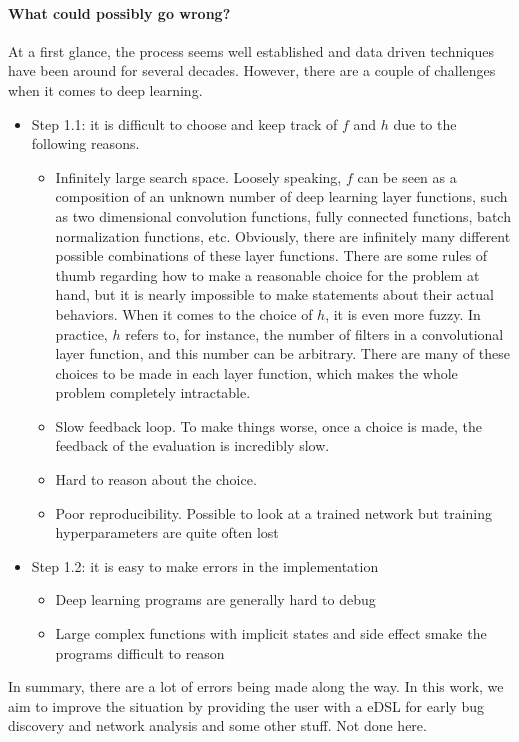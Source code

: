 \paragraph{What could possibly go wrong?}
At a first glance, the process seems well established and data driven techniques have been around for several decades. However, there are a couple of challenges when it comes to deep learning.
\begin{itemize}
\item Step 1.1: it is difficult to choose and keep track of $f$ and $h$ due to the following reasons.
\begin{itemize}
\item Infinitely large search space. Loosely speaking, $f$ can be seen as a composition of an unknown number of deep learning layer functions, such as two dimensional convolution functions, fully connected functions, batch normalization functions, etc. Obviously, there are infinitely many different possible combinations of these layer functions. There are some rules of thumb regarding how to make a reasonable choice for the problem at hand, but it is nearly impossible to make statements about their actual behaviors. When it comes to the choice of $h$, it is even more fuzzy. In practice, $h$ refers to, for instance, the number of filters in a convolutional layer function, and this number can be arbitrary. There are many of these choices to be made in each layer function, which makes the whole problem completely intractable.
\item Slow feedback loop. To make things worse, once a choice is made, the feedback of the evaluation is incredibly slow.
\item Hard to reason about the choice.
\item Poor reproducibility. Possible to look at a trained network but training hyperparameters are quite often lost
\end{itemize}
\item Step 1.2: it is easy to make errors in the implementation
\begin{itemize}
\item Deep learning programs are generally hard to debug
\item Large complex functions with implicit states and side effect smake the programs difficult to reason
\end{itemize}
\end{itemize}
In summary, there are a lot of errors being made along the way. In this work, we aim to improve the situation by providing the user with a eDSL for early bug discovery and network analysis and some other stuff. Not done here.

